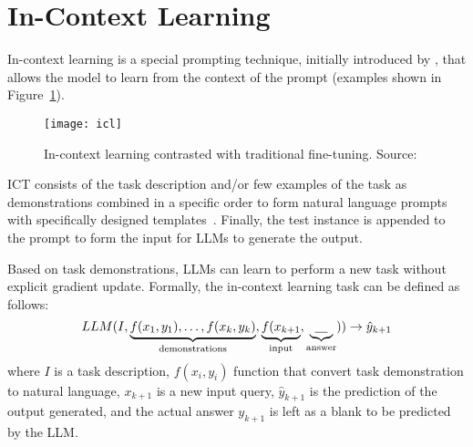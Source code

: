 \section{In-Context Learning}
\label{sec:in-context-learning}
In-context learning is a special prompting technique, initially introduced by \textcite{brown2020language}, that allows the model to learn from the context of the prompt (examples shown in Figure~\ref{fig:in-context-learning}).
\begin{figure}[h!]
	\centering
	\texttt{[image: icl]}
	\caption{In-context learning contrasted with traditional fine-tuning. Source: \textcite{brown2020language}}
	\label{fig:in-context-learning}
\end{figure}
ICT consists of the task description and/or few examples of the task as demonstrations combined in a specific order to form natural language prompts with specifically designed templates~\cite{brown2020language}.
Finally, the test instance is appended to the prompt to form the input for LLMs to generate the output.

Based on task demonstrations, LLMs can learn to perform a new task without explicit gradient update.
Formally, the in-context learning task can be defined as follows:
\begin{equation}
	LLM(I, \underbrace{f(x_1, y_1), \dots, f(x_k, y_k)}_\text{demonstrations}, \underbrace{f(x_{k+1}}_\text{input}, \underbrace{\uline{~~~}}_\text{answer})) \rightarrow \hat{y}_{k+1}
	\label{eq:ict}
\end{equation}
where $I$ is a task description, $f(x_i, y_i)$ function that convert task demonstration to natural language, $x_{k+1}$ is a new input query, $\hat{y}_{k+1}$ is the prediction of the output generated, and the actual answer $y_{k+1}$ is left as a blank to be predicted by the LLM\@.

